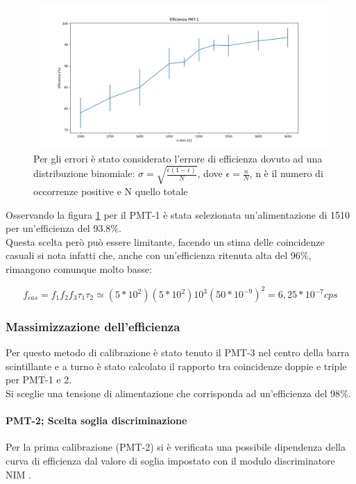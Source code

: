\documentclass[a4paper]{article}
\begin{document}
\begin{figure}[H]
\centering
\includegraphics[scale=0.3]{./immagini/TimeOfFlight/EffPMT145mV}
\caption{Per gli errori è stato considerato l'errore di efficienza dovuto ad una distribuzione binomiale: $\sigma = \sqrt{\frac{\epsilon(1-\epsilon)}{N}}$, dove $\epsilon = \frac{n}{N}$, n è il numero di occorrenze positive e N quello totale}
\label{fig:EffPMT145mV}
\end{figure}

Osservando la figura \ref{fig:EffPMT145mV} per il PMT-1 è stata selezionata un'alimentazione di 1510 per un'efficienza del 93.8$\%$.\\
Questa scelta però può essere limitante, facendo un stima delle coincidenze casuali si nota infatti che, anche con un'efficienza ritenuta alta del 96$\%$, rimangono comunque molto basse:

\begin{equation}
f_{cas} = f_1 f_2 f_3 \tau _1\tau _2 \simeq (5*10^2)(5*10^2) 10^3 (50*10^{-9})^2 = 6,25*10^{-7} cps
\label{eq:CoinCasPMT1Prova1}
\end{equation}

\subsubsection*{Massimizzazione dell'efficienza}
Per questo metodo di calibrazione è stato tenuto il PMT-3 nel centro della barra scintillante e a turno è stato calcolato il rapporto tra coincidenze doppie e triple per PMT-1 e 2.\\
Si sceglie una tensione di alimentazione che corrisponda ad un'efficienza del 98$\%$.

\paragraph{PMT-2; Scelta soglia discriminazione}
Per la prima calibrazione (PMT-2) si è verificata una possibile dipendenza della curva di efficienza dal valore di soglia impostato con il modulo discriminatore NIM .
\end{document}
